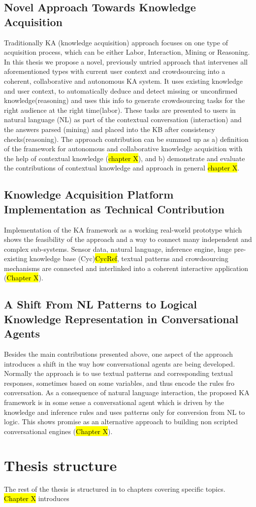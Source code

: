 \subsection{Novel Approach Towards Knowledge Acquisition}
Traditionally KA (knowledge acquisition) approach focuses on one type of acquisition process, which can be either Labor, Interaction, Mining or Reasoning\parencite{Zang2013}. In this thesis we propose a novel, previously untried approach that intervenes all aforementioned types with current user context and crowdsourcing into a coherent, collaborative and autonomous KA system. It uses existing knowledge and user context, to automatically deduce and detect  missing or unconfirmed knowledge(reasoning) and uses this info to generate crowdsourcing tasks for the right audience at the right time(labor). These tasks are presented to users in natural language (NL) as part of the contextual conversation (interaction) and the answers parsed (mining) and placed into the KB after consistency checks(reasoning). The approach contribution can be summed up as a) definition of the framework for autonomous and collaborative knowledge acquisition with the help of contextual knowledge (\hl{chapter X}), and b) demonstrate and evaluate the contributions of contextual knowledge and approach in general \hl{chapter X}.

\subsection{Knowledge Acquisition Platform Implementation as Technical Contribution }
Implementation of the KA framework as a working real-world prototype which shows the feasibility of the approach and a way to connect many independent and complex sub-systems. Sensor data, natural language, inference engine, huge pre-existing knowledge base (Cyc)\hl{CycRef}, textual patterns and crowdsourcing mechanisms are connected and interlinked into a coherent interactive application (\hl{Chapter X}).

\subsection{A Shift From NL Patterns to Logical Knowledge Representation in Conversational Agents}
Besides the main contributions presented above, one aspect of the approach introduces a shift in the way how conversational agents are being developed. Normally the approach is to use textual patterns and corresponding textual responses, sometimes based on some variables, and thus encode the rules fro conversation. As a consequence of natural language interaction, the proposed KA framework is in some sense a conversational agent which is driven by the knowledge and inference rules and uses patterns only for conversion from NL to logic. This shows promise as an alternative approach to building non scripted conversational engines (\hl{Chapter X}).

\section{Thesis structure}
The rest of the thesis is structured in to chapters covering specific topics. \hl{Chapter X} introduces